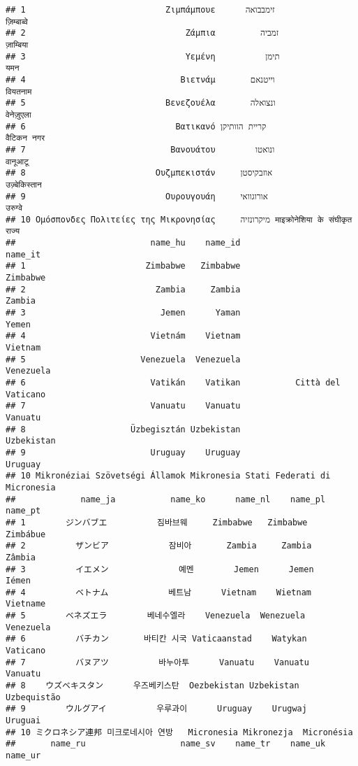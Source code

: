 \documentclass[
]{article}
\begin{document}
\begin{verbatim}
## 1                            Ζιμπάμπουε      זימבבואה                  ज़िम्बाब्वे
## 2                                Ζάμπια         זמביה                  ज़ाम्बिया
## 3                                Υεμένη          תימן                      यमन
## 4                               Βιετνάμ       וייטנאם                  वियतनाम
## 5                            Βενεζουέλα       ונצואלה                   वेनेज़ुएला
## 6                              Βατικανό קריית הוותיקן                वैटिकन नगर
## 7                             Βανουάτου        ונואטו                    वानूआटू
## 8                          Ουζμπεκιστάν     אוזבקיסטן                उज़्बेकिस्तान
## 9                            Ουρουγουάη     אורוגוואי                     उरुग्वे
## 10 Ομόσπονδες Πολιτείες της Μικρονησίας     מיקרונזיה माइक्रोनेशिया के संघीकृत राज्य
##                           name_hu    name_id                      name_it
## 1                        Zimbabwe   Zimbabwe                     Zimbabwe
## 2                          Zambia     Zambia                       Zambia
## 3                           Jemen      Yaman                        Yemen
## 4                         Vietnám    Vietnam                      Vietnam
## 5                       Venezuela  Venezuela                    Venezuela
## 6                         Vatikán    Vatikan           Città del Vaticano
## 7                         Vanuatu    Vanuatu                      Vanuatu
## 8                     Üzbegisztán Uzbekistan                   Uzbekistan
## 9                         Uruguay    Uruguay                      Uruguay
## 10 Mikronéziai Szövetségi Államok Mikronesia Stati Federati di Micronesia
##             name_ja           name_ko      name_nl    name_pl     name_pt
## 1        ジンバブエ          짐바브웨     Zimbabwe   Zimbabwe    Zimbábue
## 2          ザンビア            잠비아       Zambia     Zambia      Zâmbia
## 3          イエメン              예멘        Jemen      Jemen       Iémen
## 4          ベトナム            베트남      Vietnam    Wietnam    Vietname
## 5        ベネズエラ        베네수엘라    Venezuela  Wenezuela   Venezuela
## 6          バチカン       바티칸 시국 Vaticaanstad    Watykan    Vaticano
## 7          バヌアツ          바누아투      Vanuatu    Vanuatu     Vanuatu
## 8    ウズベキスタン      우즈베키스탄  Oezbekistan Uzbekistan Uzbequistão
## 9        ウルグアイ          우루과이      Uruguay    Urugwaj     Uruguai
## 10 ミクロネシア連邦 미크로네시아 연방   Micronesia Mikronezja  Micronésia
##       name_ru                   name_sv    name_tr    name_uk      name_ur

\end{verbatim}
\end{document}
